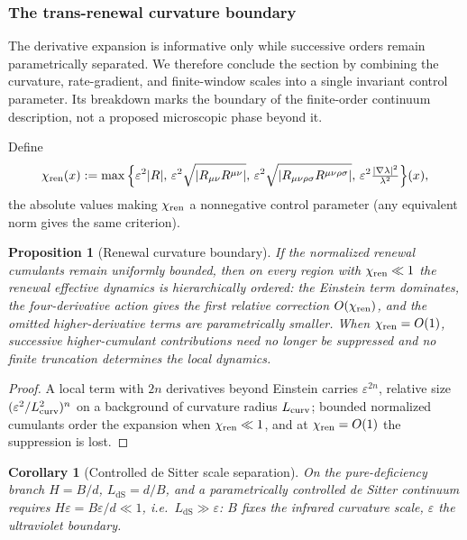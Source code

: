 \documentclass[11pt]{article}
\newtheorem{proposition}[theorem]{Proposition}
\newtheorem{corollary}[theorem]{Corollary}
\theoremstyle{definition}
\theoremstyle{remark}
\newcommand{\eps}{\varepsilon}
\newcommand{\dS}{\mathrm{dS}}
\begin{document}
\subsubsection{The trans-renewal curvature boundary}
\label{subsec:trans-renewal-boundary}

The derivative expansion is informative only while successive orders remain
parametrically separated.  We therefore conclude the section by combining the
curvature, rate-gradient, and finite-window scales into a single invariant
control parameter.  Its breakdown marks the boundary of the finite-order
continuum description, not a proposed microscopic phase beyond it.

Define
\[
 \chi_{\rm ren}(x):=\max\Big\{\eps^2|R|,\,\eps^2\sqrt{|R_{\mu\nu}R^{\mu\nu}|},\,
 \eps^2\sqrt{|R_{\mu\nu\rho\sigma}R^{\mu\nu\rho\sigma}|},\,
 \eps^2\tfrac{|\nabla\lambda|^2}{\lambda^2}\Big\}(x),
\]
the absolute values making $\chi_{\rm ren}$ a nonnegative control parameter (any
equivalent norm gives the same criterion).

\begin{proposition}[Renewal curvature boundary]
\label{prop:renewal-curvature-boundary}
If the normalized renewal cumulants remain uniformly bounded, then on every region
with $\chi_{\rm ren}\ll1$ the renewal effective dynamics is hierarchically ordered:
the Einstein term dominates, the four-derivative action gives the first relative
correction $O(\chi_{\rm ren})$, and the omitted higher-derivative terms are
parametrically smaller.  When $\chi_{\rm ren}=O(1)$, successive higher-cumulant
contributions need no longer be suppressed and no finite truncation determines the
local dynamics.
\end{proposition}

\begin{proof}
A local term with $2n$ derivatives beyond Einstein carries $\eps^{2n}$, relative size
$(\eps^2/L_{\rm curv}^2)^n$ on a background of curvature radius $L_{\rm curv}$; bounded
normalized cumulants order the expansion when $\chi_{\rm ren}\ll1$, and at
$\chi_{\rm ren}=O(1)$ the suppression is lost.
\end{proof}

\begin{corollary}[Controlled de Sitter scale separation]
\label{cor:controlled-ds-separation}
On the pure-deficiency branch $H=B/d$, $L_{\dS}=d/B$, and a parametrically controlled
de Sitter continuum requires $H\eps=B\eps/d\ll1$, i.e.\ $L_{\dS}\gg\eps$: $B$ fixes the
infrared curvature scale, $\eps$ the ultraviolet boundary.
\end{corollary}
\end{document}
